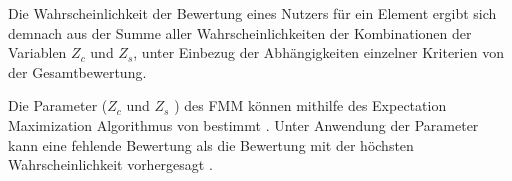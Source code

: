 Die Wahrscheinlichkeit der Bewertung eines Nutzers für ein Element ergibt sich demnach aus der Summe aller Wahrscheinlichkeiten der Kombinationen der Variablen $Z_{c}$ und $Z_{s}$, unter Einbezug der Abhängigkeiten einzelner Kriterien von der Gesamtbewertung.

Die Parameter ($Z_{c}$ und $Z_{s}$ \cite[S. 4]{si:inproceedings}) des \ac{FMM} können mithilfe des Expectation Maximization Algorithmus von \textcite[S. 1ff.]{dempster:article} bestimmt \cite[S. 863]{adomavicius:4:inbook}.
Unter Anwendung der Parameter kann eine fehlende Bewertung als die Bewertung mit der höchsten Wahrscheinlichkeit vorhergesagt \cite[S. 863]{adomavicius:4:inbook}. 


